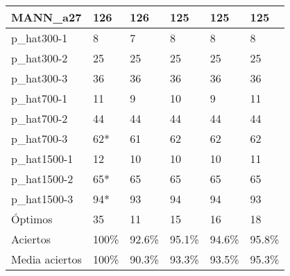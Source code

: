\begin{table}[H]
\begin{tabular}{|l|l|l|l|l|l|}
MANN\_a27          & 126 & 126 & 125 & 125 & 125 \\ \hline
p\_hat300-1        & 8 & 7 & 8 & 8 & 8 \\ \hline
p\_hat300-2        & 25 & 25 & 25 & 25 & 25 \\ \hline
p\_hat300-3        & 36 & 36 & 36 & 36 & 36 \\ \hline
p\_hat700-1        & 11 & 9 & 10 & 9 & 11 \\ \hline
p\_hat700-2        & 44 & 44 & 44 & 44 & 44 \\ \hline
p\_hat700-3        & 62* & 61 & 62 & 62 & 62 \\ \hline
p\_hat1500-1       & 12 & 10 & 10 & 10 & 11 \\ \hline
p\_hat1500-2       & 65* & 65 & 65 & 65 & 65 \\ \hline
p\_hat1500-3       & 94* & 93 & 94 & 94 & 93 \\ \hline
Óptimos            & 35  & 11 & 15 & 16 & 18 \\ \hline
Aciertos           & 100\% & 92.6\% & 95.1\% & 94.6\% & 95.8\% \\ \hline
Media aciertos     & 100\% & 90.3\% & 93.3\% & 93.5\% & 95.3\% \\ \hline
\end{tabular}
\end{table}

